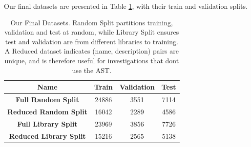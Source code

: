 Our final datasets are presented in Table \ref{tab:final_datasets}, with their train and validation splits.



\begin{table}[tb]
    \centering

    \begin{tabular}{c c c c}
    \hline
    Name       & Train & Validation & Test \\
    \hline
    \hline
    \textbf{Full Random Split}         & 24886 & 3551 & 7114 \\
    \textbf{Reduced Random Split}      & 16042 & 2289 & 4586\\
    \hline
    \hline
    \textbf{Full Library Split}         & 23969 & 3856 &7726 \\
    \textbf{Reduced Library Split}      & 15216 & 2565 & 5138 \\
    \hline
    \hline
    \end{tabular}
    \caption{Our Final Datasets. Random Split partitions training, validation and test at random, while Library Split ensures test and validation are from different libraries to training. A Reduced dataset indicates (name, description) pairs are unique, and is therefore useful for investigations that dont use the AST. }
    \label{tab:final_datasets}
\end{table}
